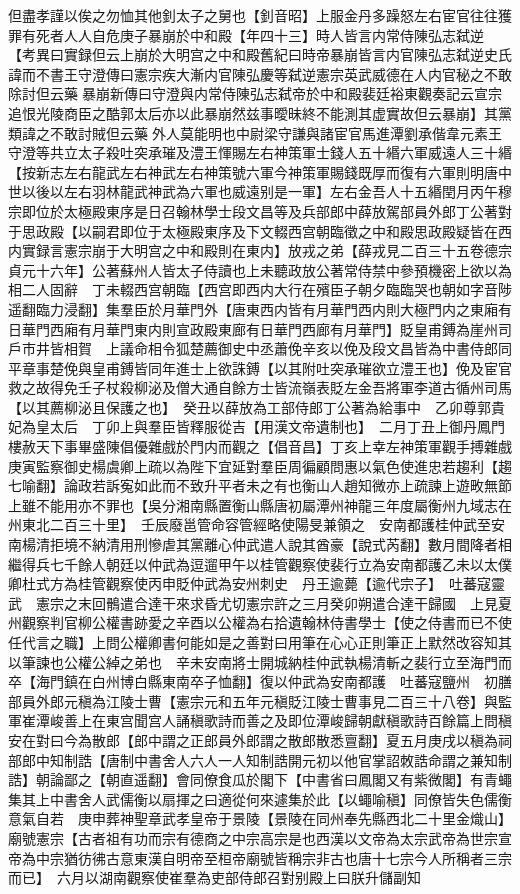 但盡孝謹以俟之勿恤其他釗太子之舅也【釗音昭】上服金丹多躁怒左右宦官往往獲罪有死者人人自危庚子暴崩於中和殿【年四十三】時人皆言内常侍陳弘志弑逆　【考異曰實録但云上崩於大明宫之中和殿舊紀曰時帝暴崩皆言内官陳弘志弑逆史氏諱而不書王守澄傳曰憲宗疾大漸内官陳弘慶等弑逆憲宗英武威德在人内官秘之不敢除討但云藥暴崩新傳曰守澄與内常侍陳弘志弑帝於中和殿裴廷裕東觀奏記云宣宗追恨光陵商臣之酷郭太后亦以此暴崩然兹事曖昧終不能測其虚實故但云暴崩】其黨類諱之不敢討賊但云藥外人莫能明也中尉梁守謙與諸宦官馬進潭劉承偕韋元素王守澄等共立太子殺吐突承璀及澧王惲賜左右神策軍士錢人五十緡六軍威遠人三十緡【按新志左右龍武左右神武左右神策號六軍今神策軍賜錢既厚而復有六軍則明唐中世以後以左右羽林龍武神武為六軍也威遠别是一軍】左右金吾人十五緡閏月丙午穆宗即位於太極殿東序是日召翰林學士段文昌等及兵部郎中薛放駕部員外郎丁公著對于思政殿【以嗣君即位于太極殿東序及下文輟西宫朝臨徵之中和殿思政殿疑皆在西内實録言憲宗崩于大明宫之中和殿則在東内】放戎之弟【薛戎見二百三十五卷德宗貞元十六年】公著蘇州人皆太子侍讀也上未聽政放公著常侍禁中參預機密上欲以為相二人固辭　丁未輟西宫朝臨【西宫即西内大行在殯臣子朝夕臨臨哭也朝如字音陟遥翻臨力浸翻】集羣臣於月華門外【唐東西内皆有月華門西内則大極門内之東廂有日華門西廂有月華門東内則宣政殿東廊有日華門西廊有月華門】貶皇甫鎛為崖州司戶市井皆相賀　上議命相令狐楚薦御史中丞蕭俛辛亥以俛及段文昌皆為中書侍郎同平章事楚俛與皇甫鎛皆同年進士上欲誅鎛【以其附吐突承璀欲立澧王也】俛及宦官救之故得免壬子杖殺柳泌及僧大通自餘方士皆流嶺表貶左金吾將軍李道古循州司馬【以其薦柳泌且保護之也】　癸丑以薛放為工部侍郎丁公著為給事中　乙卯尊郭貴妃為皇太后　丁卯上與羣臣皆釋服從吉【用漢文帝遺制也】　二月丁丑上御丹鳳門樓赦天下事畢盛陳倡優雜戲於門内而觀之【倡音昌】丁亥上幸左神策軍觀手搏雜戲庚寅監察御史楊虞卿上疏以為陛下宜延對羣臣周徧顧問惠以氣色使進忠若趨利【趨七喻翻】論政若訴寃如此而不致升平者未之有也衡山人趙知微亦上疏諫上遊畋無節上雖不能用亦不罪也【吳分湘南縣置衡山縣唐初屬潭州神龍三年度屬衡州九域志在州東北二百三十里】　壬辰廢邕管命容管經略使陽旻兼領之　安南都護桂仲武至安南楊清拒境不納清用刑慘虐其黨離心仲武遣人說其酋豪【說式芮翻】數月間降者相繼得兵七千餘人朝廷以仲武為逗遛甲午以桂管觀察使裴行立為安南都護乙未以太僕卿杜式方為桂管觀察使丙申貶仲武為安州刺史　丹王逾薨【逾代宗子】　吐蕃寇靈武　憲宗之末回鶻遣合達干來求昏尤切憲宗許之三月癸卯朔遣合達干歸國　上見夏州觀察判官柳公權書跡愛之辛酉以公權為右拾遺翰林侍書學士【使之侍書而已不使任代言之職】上問公權卿書何能如是之善對曰用筆在心心正則筆正上默然改容知其以筆諫也公權公綽之弟也　辛未安南將士開城納桂仲武執楊清斬之裴行立至海門而卒【海門鎮在白州博白縣東南卒子恤翻】復以仲武為安南都護　吐蕃寇鹽州　初膳部員外郎元稹為江陵士曹【憲宗元和五年元稹貶江陵士曹事見二百三十八卷】與監軍崔潭峻善上在東宫聞宫人誦稹歌詩而善之及即位潭峻歸朝獻稹歌詩百餘篇上問稹安在對曰今為散郎【郎中謂之正郎員外郎謂之散郎散悉亶翻】夏五月庚戌以稹為祠部郎中知制誥【唐制中書舍人六人一人知制誥開元初以他官掌詔敇誥命謂之兼知制誥】朝論鄙之【朝直遥翻】會同僚食瓜於閣下【中書省曰鳳閣又有紫微閣】有青蠅集其上中書舍人武儒衡以扇揮之曰適從何來遽集於此【以蠅喻稹】同僚皆失色儒衡意氣自若　庚申葬神聖章武孝皇帝于景陵【景陵在同州奉先縣西北二十里金熾山】廟號憲宗【古者祖有功而宗有德商之中宗高宗是也西漢以文帝為太宗武帝為世宗宣帝為中宗猶彷彿古意東漢自明帝至桓帝廟號皆稱宗非古也唐十七宗今人所稱者三宗而已】　六月以湖南觀察使崔羣為吏部侍郎召對别殿上曰朕升儲副知